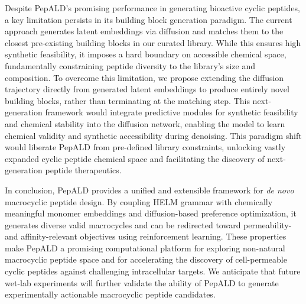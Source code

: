 Despite PepALD's promising performance in generating bioactive cyclic peptides, a key limitation persists in its building block generation paradigm. The current approach generates latent embeddings via diffusion and matches them to the closest pre-existing building blocks in our curated library. While this ensures high synthetic feasibility, it imposes a hard boundary on accessible chemical space, fundamentally constraining peptide diversity to the library's size and composition. To overcome this limitation, we propose extending the diffusion trajectory directly from generated latent embeddings to produce entirely novel building blocks, rather than terminating at the matching step. This next-generation framework would integrate predictive modules for synthetic feasibility and chemical stability into the diffusion network, enabling the model to learn chemical validity and synthetic accessibility during denoising. This paradigm shift would liberate PepALD from pre-defined library constraints, unlocking vastly expanded cyclic peptide chemical space and facilitating the discovery of next-generation peptide therapeutics.

In conclusion, PepALD provides a unified and extensible framework for \textit{de novo} macrocyclic peptide design. By coupling HELM grammar with chemically meaningful monomer embeddings and diffusion-based preference optimization, it generates diverse valid macrocycles and can be redirected toward permeability- and affinity-relevant objectives using reinforcement learning. These properties make PepALD a promising computational platform for exploring non-natural macrocyclic peptide space and for accelerating the discovery of cell-permeable cyclic peptides against challenging intracellular targets. We anticipate that future wet-lab experiments will further validate the ability of PepALD to generate experimentally actionable macrocyclic peptide candidates.
